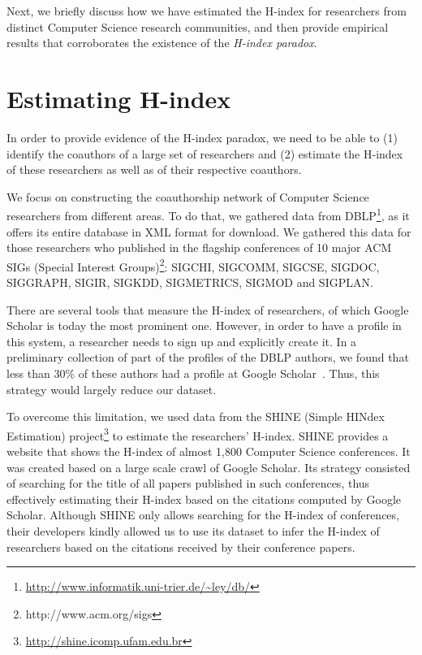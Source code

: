 \documentclass[smallextended]{svjour3}
\begin{document}

Next, we briefly discuss how we have estimated the H-index for researchers from distinct Computer Science research communities, and then provide empirical results that corroborates the existence of the {\it H-index paradox}.


\section{Estimating H-index}


In order to provide evidence of the H-index paradox, we need to be able to (1) identify the coauthors of a large set of researchers and (2) estimate the H-index of these researchers as well as of their respective coauthors.

We focus on constructing the coauthorship network of Computer Science researchers from different areas. To do that, we gathered data from DBLP\footnote{\url{http://www.informatik.uni-trier.de/~ley/db/}}, as it offers its entire database in XML format for download. We gathered this data for those researchers who published in the flagship conferences of 10 major ACM SIGs (Special Interest Groups)\footnote{http://www.acm.org/sigs}: SIGCHI, SIGCOMM, SIGCSE, SIGDOC, SIGGRAPH, SIGIR, SIGKDD,  SIGMETRICS, SIGMOD and SIGPLAN.

There are several tools that measure the H-index of researchers, of which Google Scholar is today the most prominent one. However, in order to have a profile in this system, a researcher needs to sign up and explicitly create it. In a preliminary collection of part of the profiles of the DBLP authors, we found that less than 30\% of these authors had a profile at Google Scholar~\cite{um}. Thus, this strategy would largely reduce our dataset.

To overcome this limitation, we used data from the SHINE (Simple HINdex Estimation) project\footnote{\url{http://shine.icomp.ufam.edu.br}} to estimate the researchers' H-index. SHINE provides a website that shows the H-index of almost 1,800 Computer Science conferences. It was created based on a large scale crawl of Google Scholar. Its strategy consisted of searching for the title of all papers published in such conferences, thus effectively estimating their H-index based on the citations computed by Google Scholar. Although SHINE only allows searching for the H-index of conferences, their developers kindly allowed us to use its dataset to infer the H-index of researchers based on the citations received by their conference papers.
\end{document}
